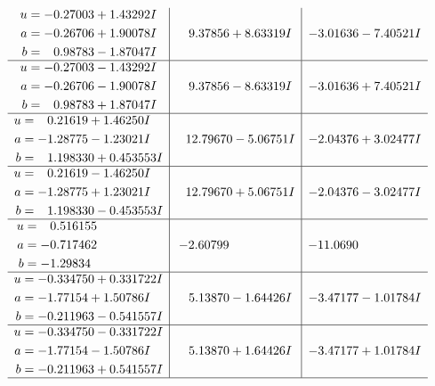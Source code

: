 \documentclass[1p]{elsarticle_modified}
\theoremstyle{definition}
\begin{document}
$$\begin{array}{c|c|c}
\begin{aligned}
u &= -0.27003 + 1.43292 I \\
a &= -0.26706 + 1.90078 I \\
b &= \phantom{-}0.98783 - 1.87047 I\end{aligned}
 & \phantom{-}9.37856 + 8.63319 I & -3.01636 - 7.40521 I \\ \hline\begin{aligned}
u &= -0.27003 - 1.43292 I \\
a &= -0.26706 - 1.90078 I \\
b &= \phantom{-}0.98783 + 1.87047 I\end{aligned}
 & \phantom{-}9.37856 - 8.63319 I & -3.01636 + 7.40521 I \\ \hline\begin{aligned}
u &= \phantom{-}0.21619 + 1.46250 I \\
a &= -1.28775 - 1.23021 I \\
b &= \phantom{-}1.198330 + 0.453553 I\end{aligned}
 & \phantom{-}12.79670 - 5.06751 I & -2.04376 + 3.02477 I \\ \hline\begin{aligned}
u &= \phantom{-}0.21619 - 1.46250 I \\
a &= -1.28775 + 1.23021 I \\
b &= \phantom{-}1.198330 - 0.453553 I\end{aligned}
 & \phantom{-}12.79670 + 5.06751 I & -2.04376 - 3.02477 I \\ \hline\begin{aligned}
u &= \phantom{-}0.516155\phantom{ +0.000000I} \\
a &= -0.717462\phantom{ +0.000000I} \\
b &= -1.29834\phantom{ +0.000000I}\end{aligned}
 & -2.60799\phantom{ +0.000000I} & -11.0690\phantom{ +0.000000I} \\ \hline\begin{aligned}
u &= -0.334750 + 0.331722 I \\
a &= -1.77154 + 1.50786 I \\
b &= -0.211963 - 0.541557 I\end{aligned}
 & \phantom{-}5.13870 - 1.64426 I & -3.47177 - 1.01784 I \\ \hline\begin{aligned}
u &= -0.334750 - 0.331722 I \\
a &= -1.77154 - 1.50786 I \\
b &= -0.211963 + 0.541557 I\end{aligned}
 & \phantom{-}5.13870 + 1.64426 I & -3.47177 + 1.01784 I\\
 \hline 
 \end{array}$$\newpage
\end{document}
